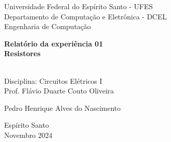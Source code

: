 \begin{titlepage}
    \begin{center}
        \large
        Universidade Federal do Espírito Santo - UFES\\
        Departamento de Computação e Eletrônica - DCEL\\
        Engenharia de Computação
        
        \vfill
        \textbf{
        Relatório da experiência 01\\
        Resistores\\~\\
        }
        
        Disciplina: Circuitos Elétricos I\\
        Prof. Flávio Duarte Couto Oliveira\\
        
        \vfill
        \begin{flushright}
            Pedro Henrique Alves do Nascimento
        \end{flushright}
        
        \vfill
        Espírito Santo\\
        Novembro 2024
    \end{center}
    \newpage
\end{titlepage}